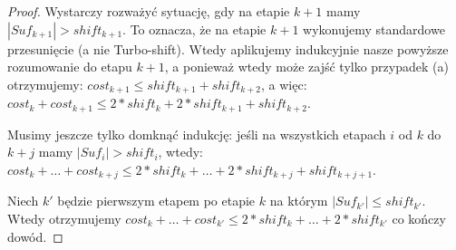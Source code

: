 \documentclass[12pt]{article}
\theoremstyle{plain}
\begin{document}
\begin{proof}
	Wystarczy rozważyć sytuację, gdy na etapie $k+1$ mamy $|Suf_{k+1}| > shift_{k+1}$. To oznacza, że na etapie $k+1$ wykonujemy standardowe przesunięcie (a nie Turbo-shift). Wtedy aplikujemy indukcyjnie nasze powyższe rozumowanie do etapu $k+1$, a ponieważ wtedy może zajść tylko przypadek (a) otrzymujemy: $cost_{k+1} \leq shift_{k+1} + shift_{k+2}$, a więc: $cost_k + cost_{k+1} \leq 2 * shift_k + 2*shift_{k+1} + shift_{k+2}$.

	Musimy jeszcze tylko domknąć indukcję: jeśli na wszystkich etapach $i$ od $k$ do $k+j$ mamy $|Suf_i| > shift_i$, wtedy: $cost_k + \ldots + cost_{k+j} \leq 2*shift_k + \ldots + 2*shift_{k+j} + shift_{k+j+1}$.

	Niech $k'$ będzie pierwszym etapem po etapie $k$ na którym $|Suf_{k'}| \leq shift_{k'}$. Wtedy otrzymujemy $cost_k + \ldots + cost_{k'} \leq 2*shift_k + \ldots + 2*shift_{k'}$ co kończy dowód.
\end{proof}
\end{document}
